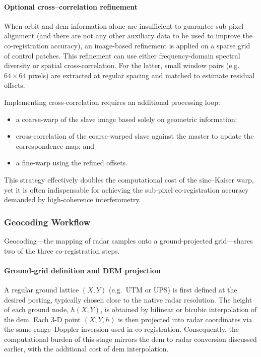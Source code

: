 \paragraph{Optional cross–correlation refinement}  
When orbit and \acs{dem} information alone are insufficient to guarantee sub-pixel alignment (and there are not any other auxiliary data to be used to improve the co-registration accuracy), an image-based refinement is applied on a sparse grid of control patches. This refinement can use either frequency-domain spectral diversity or spatial cross-correlation. For the latter, small window pairs (e.g.\ $64\times64$ pixels) are extracted at regular spacing and matched to estimate residual offsets.

Implementing cross-correlation requires an additional processing loop:  
\begin{itemize}
\item a coarse-warp of the slave image based solely on geometric information;  
\item cross-correlation of the coarse-warped slave against the master to update the correspondence map; and  
\item a fine-warp using the refined offsets.  
\end{itemize}
This strategy effectively doubles the computational cost of the sinc–Kaiser warp, yet it is often indispensable for achieving the sub-pixel co-registration accuracy demanded by high-coherence interferometry.

\subsubsection{Geocoding Workflow}

Geocoding—the mapping of radar samples onto a ground-projected grid—shares two of the three co-registration steps.

\paragraph{Ground-grid definition and DEM projection}  
A regular ground lattice \((X,Y)\) (e.g.\ UTM or UPS) is first defined at the desired posting, typically chosen close to the native radar resolution.  The height of each ground node, \(h(X,Y)\), is obtained by bilinear or bicubic interpolation of the \acs{dem}.  Each 3-D point \((X,Y,h)\) is then projected into radar coordinates via the same range–Doppler inversion used in co-registration.  Consequently, the computational burden of this stage mirrors the \acs{dem} to radar conversion discussed earlier, with the additional cost of \acs{dem} interpolation.

